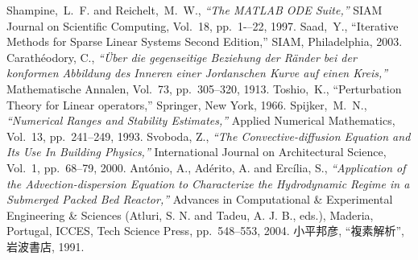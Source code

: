 \documentclass[a4paper,12pt]{nodlabpabw}
\begin{document}
\begin{thebibliography}{99}
Shampine,~L.~F. and Reichelt,~M.~W., \textsl{``The MATLAB ODE Suite,''} SIAM Journal on Scientific Computing, Vol.\ 18, pp.\ 1-–22, 1997.
Saad,~Y., ``Iterative Methods for Sparse Linear Systems Second Edition,'' SIAM, Philadelphia, 2003. 
Carath\'{e}odory, C., \textsl{``\"{U}ber die gegenseitige Beziehung der R\"{a}nder bei der konformen Abbildung des Inneren einer Jordanschen Kurve auf einen Kreis,''} Mathematische Annalen, Vol.\ 73, pp.\ 305--320, 1913.
Toshio,~K., ``Perturbation Theory for Linear operators,'' Springer, New York, 1966.
Spijker,~M.~N., \textsl{``Numerical Ranges and Stability Estimates,''} Applied Numerical Mathematics, Vol.\ 13, pp.\ 241--249, 1993. 
Svoboda, Z., \textsl{``The Convective-diffusion Equation and Its Use In Building Physics,''} International Journal on Architectural Science, Vol.\ 1, pp.\ 68--79, 2000.
Ant\'{o}nio, A., Ad\'{e}rito, A. and Erc\'{i}lia, S., \textsl{``Application of the Advection-dispersion Equation to Characterize the Hydrodynamic Regime in a Submerged Packed Bed Reactor,''} Advances in Computational \& Experimental Engineering \& Sciences (Atluri, S. N. and Tadeu, A. J. B.,
eds.), Maderia, Portugal, ICCES, Tech Science Press, pp.\ 548--553, 2004.
小平邦彦, ``複素解析'', 岩波書店, 1991.
\end{thebibliography}
\end{document}
